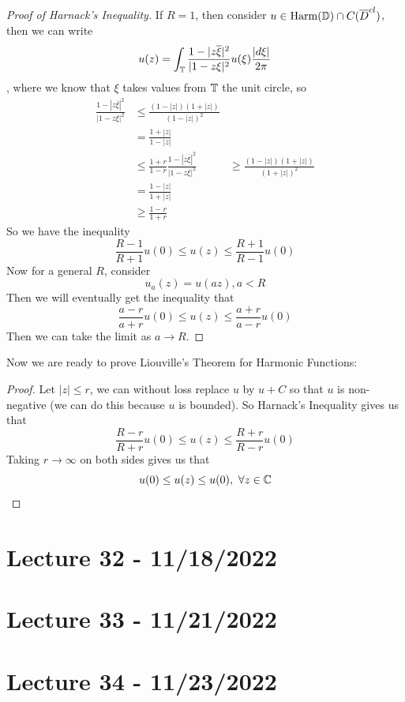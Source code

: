 \documentclass{article}
\begin{document}
\begin{proof}[Proof of Harnack's Inequality]
    If $R = 1$, then consider $u \in \text{Harm}(\mathbb{D}) \cap C(\overline{D}^{cl})$, then we can write
    \[u(z) = \int_{\mathbb{T}} \frac{1 - |z \overline{\xi}|^2}{|1 - z \xi|^2} u(\xi) \frac{|d\xi|}{2\pi}\]
    , where we know that $\xi$ takes values from $\mathbb{T}$ the unit circle, so
    \begin{align*}
        \frac{1 - |z \overline{\xi}|^2}{|1 - z \xi|^2} &\leq \frac{(1 - |z|)(1 + |z|)}{(1 - |z|)^2}\\
        &= \frac{1 + |z|}{1 - |z|}\\
        &\leq \frac{1 + r}{1 - r} \tag*{Since $|z|$ is monotonic}
        \frac{1 - |z \overline{\xi}|^2}{|1 - z \xi|^2} &\geq \frac{(1 - |z|)(1 + |z|)}{(1 + |z|)^2}\\
        &= \frac{1 - |z|}{1 + |z|}\\
        &\geq \frac{1 - r}{1 + r} \tag*{Since $|z|$ is monotonic}
    \end{align*}
    So we have the inequality
    \[\frac{R - 1}{R + 1} u(0) \leq u(z) \leq \frac{R + 1}{R - 1} u(0)\]
    Now for a general $R$, consider
    \[u_a(z) = u(az), a < R\]
    Then we will eventually get the inequality that
    \[\frac{a - r}{a + r} u(0) \leq u(z) \leq \frac{a + r}{a - r} u(0)\]
    Then we can take the limit as $a \to R$.
\end{proof}

Now we are ready to prove Liouville's Theorem for Harmonic Functions:

\begin{proof}
    Let $|z| \leq r$, we can without loss replace $u$ by $u + C$ so that $u$ is non-negative (we can do this because $u$ is bounded). So Harnack's Inequality gives us that
    \[\frac{R - r}{R + r} u(0) \leq u(z) \leq \frac{R + r}{R - r} u(0)\]
    Taking $r \to \infty$ on both sides gives us that
    \[u(0) \leq u(z) \leq u(0),\ \forall z \in \mathbb{C}\]
\end{proof}

\section{Lecture 32 - 11/18/2022}

\section{Lecture 33 - 11/21/2022}

\section{Lecture 34 - 11/23/2022}
\end{document}

